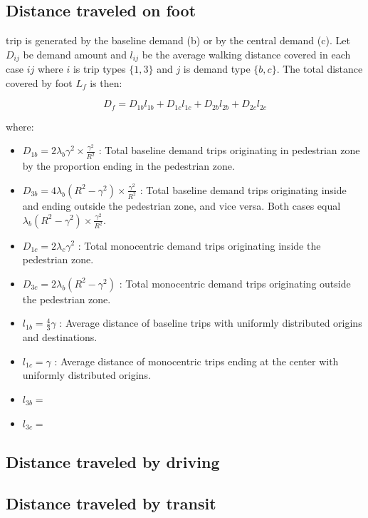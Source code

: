 \documentclass{article}
\begin{document}
\subsection{Distance traveled on foot}

trip is generated by the baseline demand (b) or by the central demand (c). Let $D_{ij}$ be demand amount and $l_{ij}$ be the average walking distance covered in each case $ij$ where $i$ is trip types $\{1,3\}$ and $j$ is demand type $\{b,c\}$. The total distance covered by foot $L_f$ is then:

\begin{equation}
     D_f = D_{1b}l_{1b} + D_{1c}l_{1c} + D_{2b}l_{2b} + D_{2c}l_{2c}
\end{equation}

where: 
\begin{itemize}
    \item $D_{1b} = 2 \lambda_b \gamma^2 \times \frac{\gamma^2}{R^2}$ : Total baseline demand trips originating in pedestrian zone by the proportion ending in the pedestrian zone.
    \item $D_{3b} = 4 \lambda_b (R^2 - \gamma^2) \times \frac{\gamma^2}{R^2}$ : Total baseline demand trips originating inside and ending outside the pedestrian zone, and vice versa. Both cases equal $\lambda_b (R^2 - \gamma^2) \times \frac{\gamma^2}{R^2}$.
    \item $D_{1c} = 2 \lambda_c \gamma^2$ : Total monocentric demand trips originating inside the pedestrian zone.
    \item $D_{3c} = 2 \lambda_b (R^2 - \gamma^2)$ : Total monocentric demand trips originating outside the pedestrian zone.
    \item $l_{1b} = \frac{4}{3}\gamma$ : Average distance of baseline trips with uniformly distributed origins and destinations.
    \item $l_{1c} = \gamma$ : Average distance of monocentric trips ending at the center with uniformly distributed origins.
    \item $l_{3b} = $
    \item $l_{3c} = $
\end{itemize}


\subsection{Distance traveled by driving}
\subsection{Distance traveled by transit}
\end{document}
